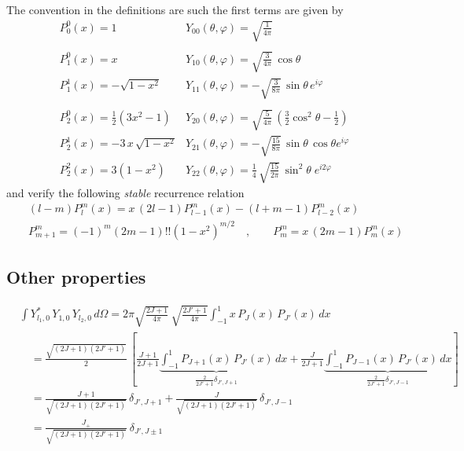 The convention in the definitions are such the first terms are given by
\[
\begin{array}{ll}
P^{0}_{0} (x) = 1 &  Y_{00}(\theta,\varphi)=\sqrt{\frac{1}{4 \pi}} \\
\\
P^{0}_{1} (x) = x & Y_{10}(\theta,\varphi) = \sqrt{\frac{3}{4 \pi}} \,
\cos \theta
\\
P^{1}_{1} (x) = -\sqrt{1 - x^{2}}   &   Y_{11}(\theta,\varphi) = -
\sqrt{\frac{3}{8 \pi}} \, \sin \theta \, e^{i \varphi}
\\
\\
P^{0}_{2} (x) = \frac{1}{2}(3 x^{2} -1) & Y_{20}(\theta,\varphi) =
\sqrt{\frac{5}{4 \pi}} \, \left(\frac{3}{2} \cos^{2} \theta -
\frac{1}{2} \right)
\\
P^{1}_{2} (x) = -3 \, x\, \sqrt{1 - x^{2}}   &   Y_{21}(\theta,\varphi)
= - \sqrt{\frac{15}{8 \pi}} \, \sin \theta \, \cos \theta e^{i
\varphi}
\\
P^{2}_{2} (x) = 3 (1-x^{2})  &  Y_{22}(\theta,\varphi) = \frac{1}{4}\,
\sqrt{\frac{15}{2\pi}} \, \sin^{2} \theta \; e^{i 2 \varphi}
\end{array}
\]
and verify the following \emph{stable} recurrence relation
\begin{eqnarray}\label{Q:sphA3}
&&(l-m)P^{m}_{l}(x) = x\, (2 l -1)P^{m}_{l-1}(x) -
(l+m-1)P^{m}_{l-2}(x)
\\
&&P^{m}_{m+1} = (-1)^{m}(2m-1)!!(1-x^{2})^{m/2}\quad , \qquad P^{m}_{m}
= x\, (2 m -1)P^{m}_{m}(x)  \nonumber
\end{eqnarray}

\subsection{Other properties}
\label{S:Spher-harmon-other-properties}

\begin{align} \label{Q:integral-3-spher-harmon} 
&\int Y^{*}_{l_{1}, 0} \,Y_{1, 0} \,  Y_{l_{2}, 0} \,d \Omega 
  = 2 \pi \sqrt{\frac{2J +1}{4 \pi}}\,\sqrt{\frac{2J' +1}{4 \pi}} \int_{-1}^{1} x\,P_{J}(x)\,P_{J'}(x) \, dx  \nonumber \\
  &\quad = \frac{\sqrt{(2J +1) (2J' +1)}}{2}\, \left[\frac{J+1}{2 J + 1}
    \underbrace{\int_{-1}^{1} P_{J+1}(x) \,P_{J'}(x)}_{\frac{2}{2J'+1}\delta_{J',J+1}} \,
    dx + \frac{J}{2 J + 1} \underbrace{\int_{-1}^{1} P_{J-1}(x) \,P_{J'}(x) \,
      dx}_{\frac{2}{2J'+1}\delta_{J',J-1}} \right]
  \nonumber \\
  &\quad = \frac{J+1}{\sqrt{(2J+1)(2J'+1)}}\, \delta_{J',J+1} +  \frac{J}{\sqrt{(2J+1)(2J'+1)}}\, \delta_{J',J-1} \nonumber \\
  &\quad = \frac{J_{+}}{\sqrt{(2J+1)(2J'+1)}}\ \delta_{J',J\pm 1} 
\end{align}

